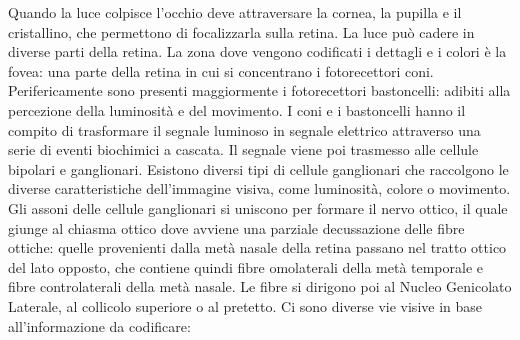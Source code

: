 Quando la luce colpisce l’occhio deve attraversare la cornea, la pupilla e il cristallino, che permettono di focalizzarla sulla retina. La luce può cadere in diverse parti della retina. La zona dove vengono codificati i dettagli e i colori è la fovea: una parte della retina in cui si concentrano i fotorecettori coni. Perifericamente sono presenti maggiormente i fotorecettori bastoncelli: adibiti alla percezione della luminosità e del movimento. I coni e i bastoncelli hanno il compito di trasformare il segnale luminoso in segnale elettrico attraverso una serie di eventi biochimici a cascata. Il segnale viene poi trasmesso alle cellule bipolari e ganglionari. Esistono diversi tipi di cellule ganglionari che raccolgono le diverse caratteristiche dell’immagine visiva, come luminosità, colore o movimento. Gli assoni delle cellule ganglionari si uniscono per formare il nervo ottico, il quale giunge al chiasma ottico dove avviene una parziale decussazione delle fibre ottiche: quelle provenienti dalla metà nasale della retina passano nel tratto ottico del lato opposto, che contiene quindi fibre omolaterali della metà temporale e fibre controlaterali della metà nasale. Le fibre si dirigono poi al Nucleo Genicolato Laterale, al collicolo superiore o al pretetto. Ci sono diverse vie visive in base all’informazione da codificare:
